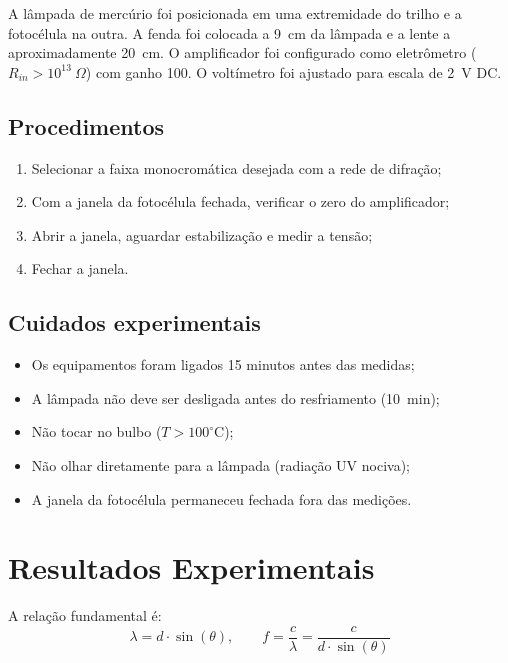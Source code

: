 \documentclass[conference]{IEEEtran}
\begin{document}
A lâmpada de mercúrio foi posicionada em uma extremidade do trilho e a fotocélula na outra. A fenda foi colocada a \SI{9}{cm} da lâmpada e a lente a aproximadamente \SI{20}{cm}.  
O amplificador foi configurado como eletrômetro ($R_{in} > 10^{13}\ \Omega$) com ganho 100. O voltímetro foi ajustado para escala de \SI{2}{V} DC.  

\subsection{Procedimentos}
\begin{enumerate}
    \item Selecionar a faixa monocromática desejada com a rede de difração;
    \item Com a janela da fotocélula fechada, verificar o zero do amplificador;
    \item Abrir a janela, aguardar estabilização e medir a tensão;
    \item Fechar a janela.
\end{enumerate}

\subsection{Cuidados experimentais}
\begin{itemize}
    \item Os equipamentos foram ligados 15 minutos antes das medidas;
    \item A lâmpada não deve ser desligada antes do resfriamento (\SI{10}{min});
    \item Não tocar no bulbo ($T > 100^\circ$C);
    \item Não olhar diretamente para a lâmpada (radiação UV nociva);
    \item A janela da fotocélula permaneceu fechada fora das medições.
\end{itemize}

\section{Resultados Experimentais}
A relação fundamental é:
\begin{equation}
\lambda = d \cdot \sin(\theta), \qquad f = \frac{c}{\lambda} = \frac{c}{d \cdot \sin(\theta)}
\end{equation}
\end{document}
